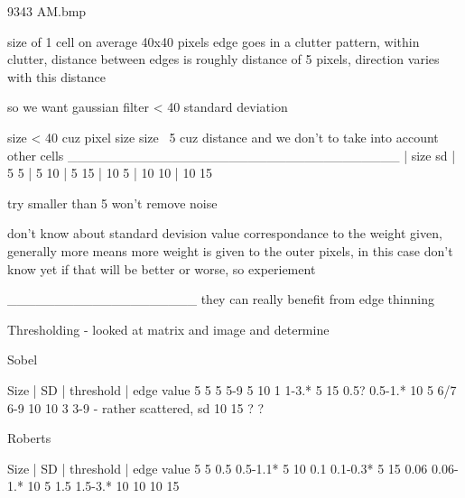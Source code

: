 9343 AM.bmp

size of 1 cell on average 40x40 pixels
edge goes in a clutter pattern, within clutter, distance between edges is roughly distance of 5 pixels, direction varies with this distance

so we want gaussian filter < 40
standard deviation 


size < 40 cuz pixel size
size ~5 cuz distance and we don't to take into account other cells
___________________________________
| size          sd
|  5            5
|  5            10
|  5            15
|  10           5
|  10           10
|  10           15

try smaller than 5 won't remove noise

don't know about standard devision value correspondance to the weight given, generally more means more weight is given to the outer pixels, in this case don't know yet if that will be better or worse, so experiement

____________________
they can really benefit from edge thinning

Thresholding - looked at matrix and image and determine

Sobel

Size    |    SD    | threshold   | edge value
5            5          5            5-9
5            10         1            1-3.*
5            15         0.5?         0.5-1.*
10           5          6/7          6-9
10           10         3            3-9 - rather scattered, sd
10           15         ?             ?

Roberts

Size    |    SD    | threshold   | edge value
5            5          0.5          0.5-1.1*
5            10         0.1          0.1-0.3*
5            15         0.06         0.06-1.*
10           5          1.5          1.5-3.*
10           10         
10           15         
